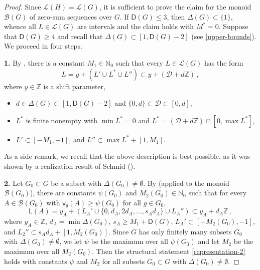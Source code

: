 \documentclass[a4paper,10pt]{amsart}
\theoremstyle{plain}
\theoremstyle{definition}
\newcommand{\N}{\mathbb N}
\newcommand{\Z}{\mathbb Z}
\numberwithin{equation}{section}
\begin{document}
\begin{proof}
Since $\mathcal L (H) = \mathcal L (G)$, it is sufficient to prove the claim for the monoid $\mathcal B (G)$ of zero-sum sequences over $G$. If $\mathsf D (G) \le 3$, then $\Delta (G) \subset \{1\}$, whence all $L \in \mathcal L (G)$ are intervals and the claim holds with $M^* = 0$. Suppose that $\mathsf D (G) \ge 4$ and recall that $\Delta(G) \subset [1, \mathsf D (G)-2]$ (see \eqref{upper-bounds}). We proceed in four steps.

\smallskip
\noindent
{\bf 1.} By \cite[Section 4.7]{Ge-HK06a}, there is a constant $M_1 \in \N_0$  such that every $L \in \mathcal L (G)$ has the form
\begin{equation} \label{representation-1}
L = y + (L' \cup L^* \cup L'') \subset y + (\mathcal D + d \Z) \,,
\end{equation}
where $y \in \Z$ is a shift parameter,
\begin{itemize}
\item $d \in \Delta (G) \subset [1, \mathsf D (G)-2]$ and  $\{0, d \} \subset \mathcal D \subset [0, d]$,

\item $L^*$ is finite nonempty with $\min L^* = 0$ and $L^* = (\mathcal D + d \Z) \cap [0, \max L^*]$,

\item $L' \subset [-M_1, -1]$, and $L'' \subset \max L^* + [1, M_1]$.
\end{itemize}
As a side remark, we recall that the above description is best possible, as it was shown by a realization result of Schmid (\cite{Sc09a}).

\smallskip
\noindent
{\bf 2.} Let $G_0 \subset G$ be a subset with $\Delta (G_0) \ne \emptyset$. By \cite[Theorem 4.3.6]{Ge-HK06a} (applied to the monoid $\mathcal B (G_0)$),  there are constants $\psi (G_0)$ and $ M_2 (G_0) \in \N_0$ such that for every $A \in \mathcal B (G_0)$ with $\mathsf v_g (A) \ge \psi (G_0)$ for all $g \in G_0$,
\begin{equation} \label{representation-2}
\mathsf L (A) = y_A + (L_A' \cup \{0, d_A , 2d_A, \ldots, s_A d_A \} \cup L_A'') \subset y_A + d_A \Z \,,
\end{equation}
where $y_A \in \Z$, $d_A = \min \Delta (G_0)$, $s_A \ge M_1+\mathsf D (G)$, $L_A' \subset [-M_2 (G_0), -1]$, and $L_2'' \subset s_A d_A + [1, M_2 (G_0)]$. Since $G$ has only finitely many subsets $G_0$ with $\Delta (G_0) \ne \emptyset$, we let $\psi$ be the maximum over all $\psi (G_0)$ and let $M_2$ be the maximum over all $M_2 (G_0)$. Then the structural statement \eqref{representation-2} holds with  constants $\psi$ and $M_2$ for all subsets $G_0 \subset G$ with $\Delta (G_0) \ne \emptyset$.


\end{proof}
\end{document}
